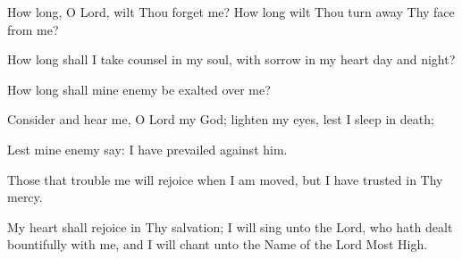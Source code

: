 How long, O Lord, wilt Thou forget me? How long wilt Thou turn away Thy face from me?

How long shall I take counsel in my soul, with sorrow in my heart day and night?

How long shall mine enemy be exalted over me?

Consider and hear me, O Lord my God; lighten my eyes, lest I sleep in death;

Lest mine enemy say: I have prevailed against him.

Those that trouble me will rejoice when I am moved, but I have trusted in Thy mercy.

My heart shall rejoice in Thy salvation; I will sing unto the Lord, who hath dealt bountifully with me, and I will chant unto the Name of the Lord Most High.
